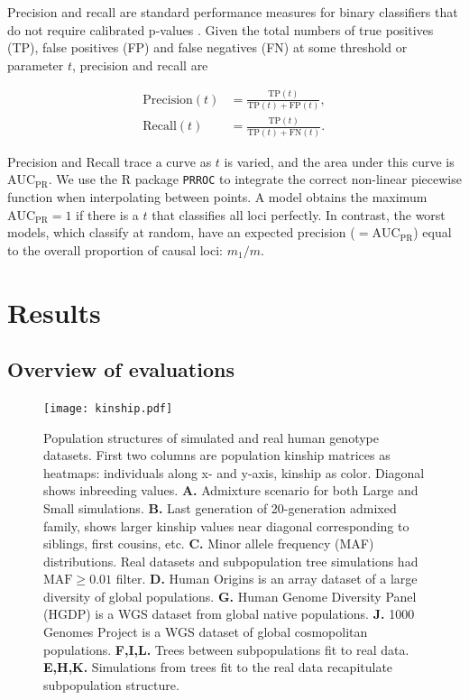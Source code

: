 \documentclass[9pt,lineno]{elife}
\newcommand{\auc}{\text{AUC}_\text{PR}}
\begin{document}
Precision and recall are standard performance measures for binary classifiers that do not require calibrated p-values \citep{grau_prroc:_2015}.
Given the total numbers of true positives (TP), false positives (FP) and false negatives (FN) at some threshold or parameter $t$, precision and recall are
\begin{linenomath*}
  \begin{align*}
    \text{Precision}(t)
    &=
      \frac{ \text{TP}(t) }{ \text{TP}(t) + \text{FP}(t) }
      , \\
    \text{Recall}(t)
    &=
      \frac{ \text{TP}(t) }{ \text{TP}(t) + \text{FN}(t) }
      .
  \end{align*}
\end{linenomath*}
Precision and Recall trace a curve as $t$ is varied, and the area under this curve is $\auc$.
We use the R package \texttt{PRROC} to integrate the correct non-linear piecewise function when interpolating between points.
A model obtains the maximum $\auc = 1$ if there is a $t$ that classifies all loci perfectly.
In contrast, the worst models, which classify at random, have an expected precision ($= \auc$) equal to the overall proportion of causal loci:
$m_1/m$.
\section{Results}

\subsection{Overview of evaluations}

\graphicspath{ {../../data/} }

\begin{figure}
  \begin{fullwidth}
    \texttt{[image: kinship.pdf]}
    \caption{
      Population structures of simulated and real human genotype datasets.
      First two columns are population kinship matrices as heatmaps: individuals along x- and y-axis, kinship as color.
      Diagonal shows inbreeding values.
      \textbf{A.}
      Admixture scenario for both Large and Small simulations.
      \textbf{B.}
      Last generation of 20-generation admixed family, shows larger kinship values near diagonal corresponding to siblings, first cousins, etc.
      \textbf{C.}
      Minor allele frequency (MAF) distributions.
      Real datasets and subpopulation tree simulations had $\text{MAF} \ge 0.01$ filter.
      \textbf{D.}
      Human Origins is an array dataset of a large diversity of global populations.
      \textbf{G.}
      Human Genome Diversity Panel (HGDP) is a WGS dataset from global native populations.
      \textbf{J.}
      1000 Genomes Project is a WGS dataset of global cosmopolitan populations.
      \textbf{F,I,L.}
      Trees between subpopulations fit to real data.
      \textbf{E,H,K.}
      Simulations from trees fit to the real data recapitulate subpopulation structure.
    }
    \label{fig:kinship}
  \end{fullwidth}
\end{figure}
\end{document}
